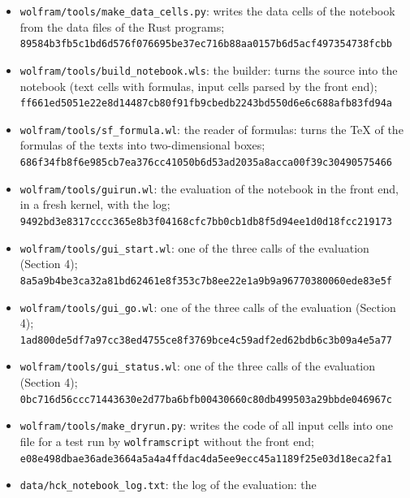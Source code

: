 \documentclass[
  10pt,
]{article}
\begin{document}
\begin{itemize}
  \texttt{wolfram/tools/make\_data\_cells.py\ R}; its first lines name
  the data files and their SHA-256 checksums);\\
  \texttt{0df097f31f5630e03838f8054ff6c696e278b693383ffb571dfa08a5ad4a50c2}
\item
  \texttt{wolfram/tools/make\_data\_cells.py}: writes the data cells of
  the notebook from the data files of the Rust programs;\\
  \texttt{89584b3fb5c1bd6d576f076695be37ec716b88aa0157b6d5acf497354738fcbb}
\item
  \texttt{wolfram/tools/build\_notebook.wls}: the builder: turns the
  source into the notebook (text cells with formulas, input cells parsed
  by the front end);\\
  \texttt{ff661ed5051e22e8d14487cb80f91fb9cbedb2243bd550d6e6c688afb83fd94a}
\item
  \texttt{wolfram/tools/sf\_formula.wl}: the reader of formulas: turns
  the TeX of the formulas of the texts into two-dimensional boxes;\\
  \texttt{686f34fb8f6e985cb7ea376cc41050b6d53ad2035a8acca00f39c30490575466}
\item
  \texttt{wolfram/tools/guirun.wl}: the evaluation of the notebook in
  the front end, in a fresh kernel, with the log;\\
  \texttt{9492bd3e8317cccc365e8b3f04168cfc7bb0cb1db8f5d94ee1d0d18fcc219173}
\item
  \texttt{wolfram/tools/gui\_start.wl}: one of the three calls of the
  evaluation (Section 4);\\
  \texttt{8a5a9b4be3ca32a81bd62461e8f353c7b8ee22e1a9b9a96770380060ede83e5f}
\item
  \texttt{wolfram/tools/gui\_go.wl}: one of the three calls of the
  evaluation (Section 4);\\
  \texttt{1ad800de5df7a97cc38ed4755ce8f3769bce4c59adf2ed62bdb6c3b09a4e5a77}
\item
  \texttt{wolfram/tools/gui\_status.wl}: one of the three calls of the
  evaluation (Section 4);\\
  \texttt{0bc716d56ccc71443630e2d77ba6bfb00430660c80db499503a29bbde046967c}
\item
  \texttt{wolfram/tools/make\_dryrun.py}: writes the code of all input
  cells into one file for a test run by \texttt{wolframscript} without
  the front end;\\
  \texttt{e08e498dbae36ade3664a5a4a4ffdac4da5ee9ecc45a1189f25e03d18eca2fa1}
\item
  \texttt{data/hck\_notebook\_log.txt}: the log of the evaluation: the

\end{itemize}
\end{document}
